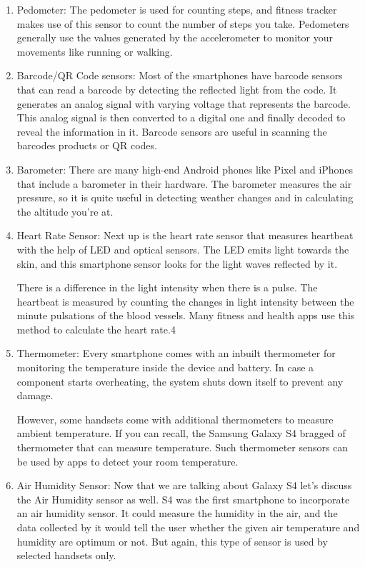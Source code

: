 \documentclass[12pt]{article}
\begin{document}
\begin{enumerate}
\item Pedometer: The pedometer is used for counting steps, and fitness tracker makes use of this sensor to count the number of steps you take. Pedometers generally use the values generated by the accelerometer to monitor your movements like running or walking.

\item Barcode/QR Code sensors: Most of the smartphones have barcode sensors that can read a barcode by detecting the reflected light from the code. It generates an analog signal with varying voltage that represents the barcode. This analog signal is then converted to a digital one and finally decoded to reveal the information in it. Barcode sensors are useful in scanning the barcodes products or QR codes.

\item Barometer: There are many high-end Android phones like Pixel and iPhones that include a barometer in their hardware. The barometer measures the air pressure, so it is quite useful in detecting weather changes and in calculating the altitude you’re at.

\item Heart Rate Sensor: Next up is the heart rate sensor that measures heartbeat with the help of LED and optical sensors. The LED emits light towards the skin, and this smartphone sensor looks for the light waves reflected by it.

There is a difference in the light intensity when there is a pulse. The heartbeat is measured by counting the changes in light intensity between the minute pulsations of the blood vessels. Many fitness and health apps use this method to calculate the heart rate.4

\item Thermometer: Every smartphone comes with an inbuilt thermometer for monitoring the temperature inside the device and battery. In case a component starts overheating, the system shuts down itself to prevent any damage.

However, some handsets come with additional thermometers to measure ambient temperature. If you can recall, the Samsung Galaxy S4 bragged of thermometer that can measure temperature. Such thermometer sensors can be used by apps to detect your room temperature.

\item Air Humidity Sensor: Now that we are talking about Galaxy S4 let’s discuss the Air Humidity sensor as well. S4 was the first smartphone to incorporate an air humidity sensor. It could measure the humidity in the air, and the data collected by it would tell the user whether the given air temperature and humidity are optimum or not. But again, this type of sensor is used by selected handsets only.


\end{enumerate}
\end{document}
